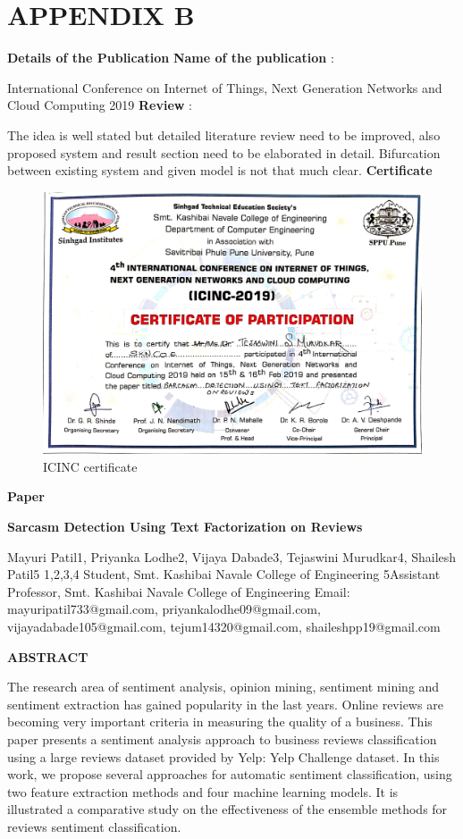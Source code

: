 \documentclass[oneside,a4paper,12pt]{book}
\begin{document}
\section{APPENDIX B}
\textbf{Details of the Publication}
\newline
\textbf{Name of the publication} : \par International Conference on Internet of Things, Next Generation Networks and Cloud Computing 2019
\newline
\textbf{Review} :\par The idea is well stated but detailed literature review need to be improved, also proposed system and result section need to be elaborated in detail. Bifurcation between existing system and given model is not that much clear.
\newpage
\textbf{Certificate}
\begin{figure}[h!]
  \centering
  \includegraphics[width=\linewidth]{cert.jpg}
  \caption{ICINC certificate}
\end{figure}
\newpage
\textbf{Paper}
\newline
\begin{center}
 \textbf{Sarcasm Detection Using Text Factorization on Reviews}

Mayuri Patil1, Priyanka Lodhe2, Vijaya Dabade3, Tejaswini Murudkar4, Shailesh Patil5
1,2,3,4 Student, Smt. Kashibai Navale College of Engineering
5Assistant Professor, Smt. Kashibai Navale College of Engineering
Email: mayuripatil733@gmail.com, priyankalodhe09@gmail.com,  vijayadabade105@gmail.com, tejum14320@gmail.com, shaileshpp19@gmail.com 
\end{center}
 
\textbf{ABSTRACT} \par The research area of sentiment analysis, opinion mining, sentiment mining and sentiment extraction has gained popularity in the last years. Online reviews are becoming very important criteria in measuring the quality of a business. This paper presents a sentiment analysis approach to business reviews classification using a large reviews dataset provided by Yelp: Yelp Challenge dataset. In this work, we propose several approaches for automatic sentiment classification, using two feature extraction methods and four machine learning models. It is illustrated a comparative study on the effectiveness of the ensemble methods for reviews sentiment classification.
\end{document}
